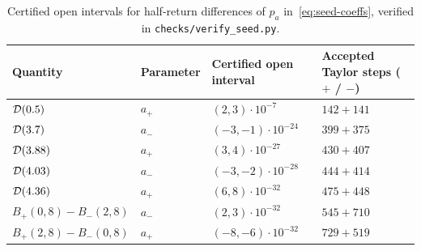 \begin{table}[ht]
\centering\small
\caption{Certified open intervals for half-return differences of $p_a$ in~\eqref{eq:seed-coeffs}, verified in \texttt{checks/\allowbreak verify\_\allowbreak seed.py}.}\label{tab:seed}
\smallskip
\begin{tabular}{@{}llll@{}}
\toprule
Quantity & Parameter & Certified open interval & Accepted Taylor steps ($+$ / $-$) \\
\midrule
$\mathcal{D}(0.5)$ & $a_+$ & $(2,3)\cdot 10^{-7}$ & $142 + 141$ \\
$\mathcal{D}(3.7)$ & $a_-$ & $(-3,-1)\cdot 10^{-24}$ & $399 + 375$ \\
$\mathcal{D}(3.88)$ & $a_+$ & $(3,4)\cdot 10^{-27}$ & $430 + 407$ \\
$\mathcal{D}(4.03)$ & $a_-$ & $(-3,-2)\cdot 10^{-28}$ & $444 + 414$ \\
$\mathcal{D}(4.36)$ & $a_+$ & $(6,8)\cdot 10^{-32}$ & $475 + 448$ \\
$B_+(0,8)-B_-(2,8)$ & $a_-$ & $(2,3)\cdot 10^{-32}$ & $545 + 710$ \\
$B_+(2,8)-B_-(0,8)$ & $a_+$ & $(-8,-6)\cdot 10^{-32}$ & $729 + 519$ \\
\bottomrule
\end{tabular}
\end{table}

